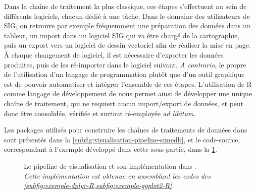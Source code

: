 Dans la chaîne de traitement la plus classique, ces étapes s'effectuent au sein de différents logiciels, chacun dédié à une tâche. Dans le domaine des utilisateurs de SIG, on retrouve par exemple fréquemment une préparation des données dans un tableur, un import dans un logiciel SIG qui va être chargé de la cartographie, puis un export vers un logiciel de dessin vectoriel afin de réaliser la mise en page.
À chaque changement de logiciel, il est nécessaire d'exporter les données produites, puis de les ré-importer dans le logiciel suivant.
\textit{A contrario}, le propre de l'utilisation d'un langage de programmation plutôt que d'un outil graphique est de pouvoir automatiser et intégrer l'ensemble de ces étapes.
L'utilisation de \textsf{R} comme langage de développement de \simedb{} nous permet ainsi de développer une unique chaîne de traitement, qui ne requiert aucun import/export de données, et peut donc être consolidée, vérifiée et surtout ré-employée \textit{ad libitum}.

Les packages utilisés pour construire les chaînes de traitements de données dans \simedb{} sont présentés dans la \cref{subfig:visualisation-pipeline-simedb}, et le code-source, correspondant à l'exemple développé dans cette sous-partie, dans la \cref{fig:visualisation-pipeline-exemple}.
\clearpage

\begin{figure}[H]
	\centering
	\hspace{5pt}
	\caption[Le \og pipeline\fg{} de visualisation et son implémentation dans \simedb{}.]{Le \og pipeline\fg{} de visualisation et son implémentation dans \simedb{}.\\
	\textit{Cette implémentation est obtenue en assemblant les codes des \cref{subfig:exemple-dplyr-R,subfig:exemple-ggplot2-R}.}}
	\label{fig:visualisation-pipeline-exemple}
\end{figure}

